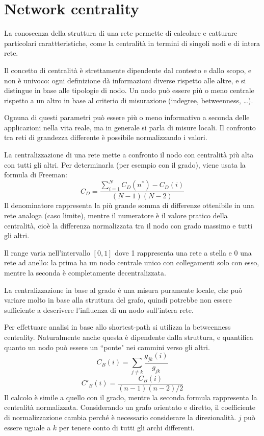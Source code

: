 \section{Network centrality}
La conoscenza della struttura di una rete permette di calcolare e catturare particolari carattteristiche, come la centralità in termini di singoli nodi e di intera rete.

Il concetto di centralità è strettamente dipendente dal contesto e dallo scopo, e non è univoco: ogni definizione dà informazioni diverse rispetto alle altre, e si distingue in base alle tipologie di nodo. Un nodo può essere più o meno centrale rispetto a un altro in base al criterio di misurazione (indegree, betweenness, \dots). 

Ognuna di questi parametri può essere più o meno informativo a seconda delle applicazioni nella vita reale, ma in generale si parla di misure locali. Il confronto tra reti di grandezza differente è possibile normalizzando i valori. 

La centralizzazione di una rete mette a confronto il nodo con centralità più alta con tutti gli altri. Per determinarla (per esempio con il grado), viene usata la formula di Freeman:
$$C_D = \frac{\sum_{i=1}^{N} C_D(n^*) - C_D(i)}{(N - 1) (N - 2)}$$
Il denominatore rappresenta la più grande somma di differenze ottenibile in una rete analoga (caso limite), mentre il numeratore è il valore pratico della centralità, cioè la differenza normalizzata tra il nodo con grado massimo e tutti gli altri.

Il range varia nell'intervallo $[0, 1]$ dove 1 rappresenta una rete a stella e 0 una rete ad anello: la prima ha un nodo centrale unico con collegamenti solo con esso, mentre la seconda è completamente decentralizzata. 

La centralizzazione in base al grado è una misura puramente locale, che può variare molto in base alla struttura del grafo, quindi potrebbe non essere sufficiente a descrivere l'influenza di un nodo sull'intera rete. 

Per effettuare analisi in base allo shortest-path si utilizza la betweenness centrality. Naturalmente anche questa è dipendente dalla struttura, e quantifica quanto un nodo può essere un  ``ponte" nei cammini verso gli altri.
$$C_B(i) = \sum_{j \neq k}\frac{g_{jk}(i)}{g_{jk}}$$
$$C'_B(i) = \frac{C_B(i)}{(n - 1) (n - 2) / 2}$$
Il calcolo è simile a quello con il grado, mentre la seconda formula rappresenta la centralità normalizzata. Considerando un grafo orientato e diretto, il coefficiente di normalizzazione cambia perché è necessario considerare la direzionalità. $j$ può essere uguale a $k$ per tenere conto di tutti gli archi differenti.

